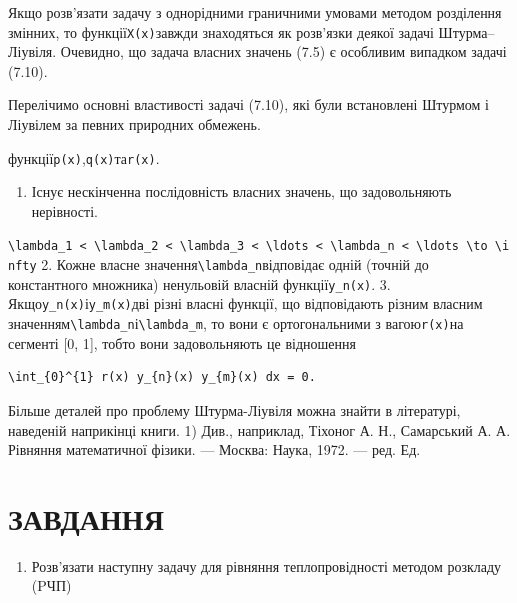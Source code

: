 \documentclass[
  ukrainian,
]{article}
\providecommand{\tightlist}{%
  \setlength{\itemsep}{0pt}\setlength{\parskip}{0pt}}
\begin{document}
Якщо розв'язати задачу з однорідними граничними умовами методом
розділення змінних, то функції\texttt{X(x)}завжди знаходяться як
розв'язки деякої задачі Штурма--Ліувіля. Очевидно, що задача власних
значень (7.5) є особливим випадком задачі (7.10).

Перелічимо основні властивості задачі (7.10), які були встановлені
Штурмом і Ліувілем за певних природних обмежень.

функції\texttt{p(x)},\texttt{q(x)}та\texttt{r(x)}.

\begin{enumerate}
\def\labelenumi{\arabic{enumi}.}
\tightlist
\item
  Існує нескінченна послідовність власних значень, що задовольняють
  нерівності.
\end{enumerate}

\texttt{\textbackslash{}lambda\_1\ \textless{}\ \textbackslash{}lambda\_2\ \textless{}\ \textbackslash{}lambda\_3\ \textless{}\ \textbackslash{}ldots\ \textless{}\ \textbackslash{}lambda\_n\ \textless{}\ \textbackslash{}ldots\ \textbackslash{}to\ \textbackslash{}infty}
2. Кожне власне значення\texttt{\textbackslash{}lambda\_n}відповідає
одній (точній до константного множника) ненульовій власній
функції\texttt{y\_n(x)}. 3. Якщо\texttt{y\_n(x)}і\texttt{y\_m(x)}дві
різні власні функції, що відповідають різним власним
значенням\texttt{\textbackslash{}lambda\_n}і\texttt{\textbackslash{}lambda\_m},
то вони є ортогональними з вагою\texttt{r(x)}на сегменті {[}0, 1{]},
тобто вони задовольняють це відношення

\begin{verbatim}
\int_{0}^{1} r(x) y_{n}(x) y_{m}(x) dx = 0.
\end{verbatim}

Більше деталей про проблему Штурма-Ліувіля можна знайти в літературі,
наведеній наприкінці книги. 1) Див., наприклад, Тіхоног А. Н.,
Самарський А. А. Рівняння математичної фізики. --- Москва: Наука, 1972.
--- ред. Ед.

\section{ЗАВДАННЯ}\label{ux437ux430ux432ux434ux430ux43dux43dux44f-3}

\begin{enumerate}
\def\labelenumi{\arabic{enumi}.}
\tightlist
\item
  Розв'язати наступну задачу для рівняння теплопровідності методом
  розкладу (PЧП)
\end{enumerate}
\end{document}
